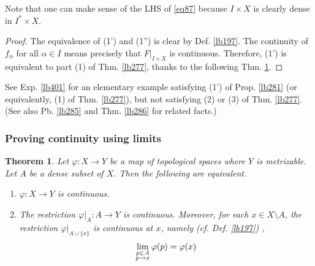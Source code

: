\documentclass[12pt,b5paper,notitlepage]{article}
\theoremstyle{definition}
\theoremstyle{plain}
\newtheorem{thm}[df]{Theorem}
\numberwithin{equation}{section}
\begin{document}
Note that one can make sense of the LHS of \eqref{eq87} because $I\times X$ is clearly dense in $I^*\times X$. %

\begin{proof}
The equivalence of (1') and (1'') is clear by Def. \ref{lb197}. The continuity of $f_\alpha$ for all $\alpha\in I$ means precisely that $F|_{I\times X}$ is continuous. Therefore, (1') is equivalent to part (1) of Thm. \ref{lb277}, thanks to the following Thm. \ref{lb276}.
\end{proof}


See Exp. \ref{lb401} for an elementary example satisfying (1') of Prop. \ref{lb281} (or equivalently, (1) of Thm. \ref{lb277}), but not satisfying (2) or (3) of Thm. \ref{lb277}. (See also Pb. \ref{lb285} and Thm. \ref{lb286} for related facts.)






\subsubsection{Proving continuity using limits}



\begin{thm}\label{lb276}
Let $\varphi:X\rightarrow Y$ be a map of topological spaces where $Y$ is metrizable. Let $A$ be a dense subset of $X$. Then the following are equivalent.
\begin{enumerate}[label=(\arabic*)]
\item $\varphi:X\rightarrow Y$ is continuous.
\item The restriction $\varphi|_A:A\rightarrow Y$ is continuous. Moreover, for each $x\in X\setminus A$, the restriction $\varphi|_{A\cup\{x\}}$ is continuous at $x$, namely (cf. Def. \ref{lb197}) ,
\begin{align}
\lim_{
\begin{subarray}{c}
p\in A\\
p\rightarrow x
\end{subarray}
}\varphi(p)=\varphi(x)
\end{align}
\end{enumerate}
\end{thm}
\end{document}
